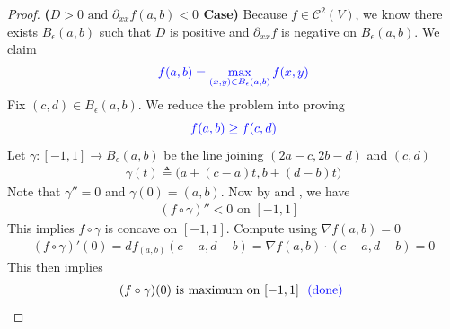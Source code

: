 \documentclass{report}
\begin{document}
\begin{proof}
\textbf{($D>0\text{ and }\partial_{xx}f(a,b)<0$ Case)} Because $f\in\mathcal{C}^2(V)$, we know there exists $B_\epsilon (a,b)$ such that $D$ is positive and $\partial _{xx}f$ is negative on  $B_\epsilon (a,b)$. We claim 
\begin{align*}
  \textcolor{blue}{f(a,b)=\max_{(x,y)\in B_\epsilon (a,b)}f(x,y)}
\end{align*}
Fix $(c,d)\in B_{\epsilon }(a,b)$. We reduce the problem into proving 
\begin{align*}
  \textcolor{blue}{f(a,b)\geq  f(c,d)}
\end{align*}
Let $\gamma: [-1,1]\rightarrow B_{\epsilon }(a,b)$ be the line joining $(2a-c,2b-d)$ and $(c,d)$ 
\begin{align*}
\gamma (t)\triangleq \Big(a+(c-a)t, b+(d-b)t \Big)
\end{align*}
Note that $\gamma''=0$ and $\gamma (0)=(a,b)$. Now by  and , we have 
\begin{align*}
  (f\circ \gamma )''<0\text{ on $[-1,1]$ }
\end{align*}
This implies $f\circ \gamma  $ is concave on $[-1,1]$. Compute using $\nabla f(a,b)=0$
 \begin{align*}
   (f\circ \gamma )'(0)=df_{(a,b)}(c-a,d-b)=\nabla f(a,b)\cdot (c-a,d-b)=0 
\end{align*}
This then implies 
\begin{align*}
  (f\circ \gamma )(0)\text{ is maximum on $[-1,1]$ }\textcolor{blue}{\text{ (done) }}
\end{align*}
\end{proof}
\end{document}
